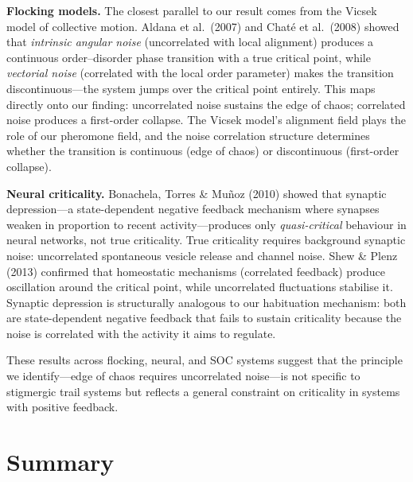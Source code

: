 \documentclass[11pt,a4paper]{article}
\begin{document}
\textbf{Flocking models.}
The closest parallel to our result comes from the Vicsek model of collective motion.
Aldana et al.\ (2007) and Chat\'e et al.\ (2008) showed that \emph{intrinsic angular noise} (uncorrelated with local alignment) produces a continuous order--disorder phase transition with a true critical point, while \emph{vectorial noise} (correlated with the local order parameter) makes the transition discontinuous---the system jumps over the critical point entirely.
This maps directly onto our finding: uncorrelated noise sustains the edge of chaos; correlated noise produces a first-order collapse.
The Vicsek model's alignment field plays the role of our pheromone field, and the noise correlation structure determines whether the transition is continuous (edge of chaos) or discontinuous (first-order collapse).

\textbf{Neural criticality.}
Bonachela, Torres \& Mu\~noz (2010) showed that synaptic depression---a state-dependent negative feedback mechanism where synapses weaken in proportion to recent activity---produces only \emph{quasi-critical} behaviour in neural networks, not true criticality.
True criticality requires background synaptic noise: uncorrelated spontaneous vesicle release and channel noise.
Shew \& Plenz (2013) confirmed that homeostatic mechanisms (correlated feedback) produce oscillation around the critical point, while uncorrelated fluctuations stabilise it.
Synaptic depression is structurally analogous to our habituation mechanism: both are state-dependent negative feedback that fails to sustain criticality because the noise is correlated with the activity it aims to regulate.

These results across flocking, neural, and SOC systems suggest that the principle we identify---edge of chaos requires uncorrelated noise---is not specific to stigmergic trail systems but reflects a general constraint on criticality in systems with positive feedback.

\section{Summary}
\end{document}
